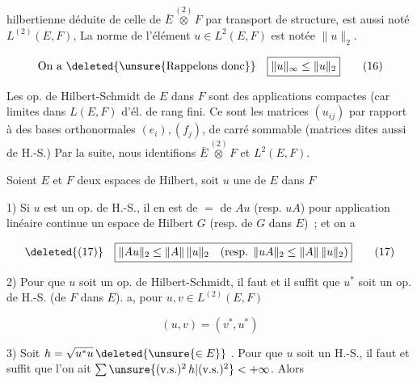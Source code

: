 hilbertienne déduite de celle de $\bar E\overset{(2)}{\otimes}F$ par transport
de structure, est aussi noté $L^{(2)}(E,F)$,  La norme de 
 l'élément $u\in L^2(E,F)$ est notée $\|u\|_2$.

\[
\text{On a }\deleted{\text{\unsure{Rappelons donc}}}\quad\boxed{\|u\|_\infty\leq\|u\|_2} \tag*{(16)}
\]

Les op. de Hilbert-Schmidt de $E$ dans $F$
sont des applications compactes (car limites dans $L(E,F)$ d'él. de rang fini. Ce sont
   les matrices $(u_{ij})$ par rapport à des bases
orthonormales $(e_i),(f_j)$,  de carré sommable
(matrices dites aussi de H.-S.)  Par la suite, nous
identifions $\bar E\overset{(2)}{\otimes} F$ et $L^2(E,F)$.


\uline{} Soient $E$ et $F$ deux espaces de Hilbert,
soit $u$ une   de $E$ dans $F$

1) Si $u$ est un op. de H.-S., il en est de $=$
de $Au$ (resp. $uA$) pour  application linéaire
continue   un espace de Hilbert $G$  (resp. de
$G$ dans $E$) \,; et on a

\[
\deleted{(17)}\quad\boxed{\|Au\|_2\leq\|A\|\,\|u\|_2\quad
\text{(resp. }\|uA\|_2\leq\|A\|\,\|u\|_2\text{)}} \tag*{(17)}
\]

2) Pour que $u$ soit un op. de Hilbert-Schmidt, il
faut et il suffit que $u^*$ soit un op. de
H.-S. (de $F$ dans $E$). 
 a, pour $u,v\in L^{(2)}(E,F)$

\[
\boxed{(u,v)=(v^*,u^*)} \tag*{(18)}
\]


3) Soit $h=\sqrt{u^*u}\,\deleted{\unsure{\in E}}$ . Pour que $u$ soit un
H.-S., il faut et suffit  
 que l'on ait $\sum\unsure{(\mathrm{v.s.})^2\,h|(\mathrm{v.s.})^2}<+\infty$. Alors

